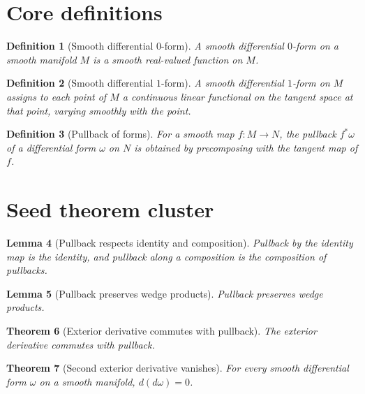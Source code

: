 \documentclass[11pt]{article}
\newtheorem{definition}{Definition}[section]
\newtheorem{lemma}[definition]{Lemma}
\newtheorem{theorem}[definition]{Theorem}
\begin{document}
\section{Core definitions}

\begin{definition}[Smooth differential $0$-form]\label{def:smooth-zero-form}
A smooth differential $0$-form on a smooth manifold $M$ is a smooth real-valued
function on $M$.
\end{definition}

\begin{definition}[Smooth differential $1$-form]\label{def:smooth-one-form}
A smooth differential $1$-form on $M$ assigns to each point of $M$ a continuous
linear functional on the tangent space at that point, varying smoothly with the
point.
\end{definition}

\begin{definition}[Pullback of forms]\label{def:pullback-of-forms}
For a smooth map $f : M \to N$, the pullback $f^* \omega$ of a differential form
$\omega$ on $N$ is obtained by precomposing with the tangent map of $f$.
\end{definition}

\section{Seed theorem cluster}

\begin{lemma}[Pullback respects identity and composition]
\label{lem:pullback-functoriality}
Pullback by the identity map is the identity, and pullback along a composition
is the composition of pullbacks.
\end{lemma}

\begin{lemma}[Pullback preserves wedge products]\label{lem:pullback-preserves-wedge}
Pullback preserves wedge products.
\end{lemma}

\begin{theorem}[Exterior derivative commutes with pullback]
\label{thm:exterior-derivative-commutes-with-pullback}
The exterior derivative commutes with pullback.
\end{theorem}

\begin{theorem}[Second exterior derivative vanishes]
\label{thm:second-exterior-derivative-vanishes}
For every smooth differential form $\omega$ on a smooth manifold,
$d(d\omega) = 0$.
\end{theorem}
\end{document}
